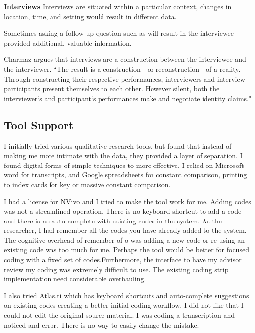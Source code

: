 \textbf{Interviews}
Interviews are situated within a particular context, changes in location, time, and setting would result in different data. 

Sometimes asking a follow-up question such as  will result in the interviewee provided additional, valuable information.

Charmaz argues that interviews are a construction between the interviewee and the interviewer. ``The result is a construction - or reconstruction - of a reality. Through constructing their respective performances, interviewers and interview participants present themselves to each other. However silent, both the interviewer`s and participant`s performances make and negotiate identity claims." 



\subsection{Tool Support}
I initially tried various qualitative research tools, but found that instead of making me more intimate with the data, they provided a layer of separation. I found digital forms of simple techniques to more effective. I relied on Microsoft word for transcripts, and Google spreadsheets for constant comparison, printing to index cards for key or massive constant comparison.

I had a license for NVivo and I tried to make the tool work for me. Adding codes was not a streamlined operation. There is no keyboard shortcut to add a code and there is no auto-complete with existing codes in the system. As the researcher, I had remember all the codes you have already added to the system. The cognitive overhead of remember of o was adding a new code or re-using an existing code was too much for me. Perhaps the tool would be better for focused coding with a fixed set of codes.Furthermore, the interface to have my advisor review my coding was extremely difficult to use. The existing coding strip implementation need considerable overhauling.

I also tried Atlas.ti which has keyboard shortcuts and auto-complete suggestions on existing codes creating a better initial coding workflow. I did not like that I could not edit the original source material. I was coding a transcription and noticed and error. There is no way to easily change the mistake. 


